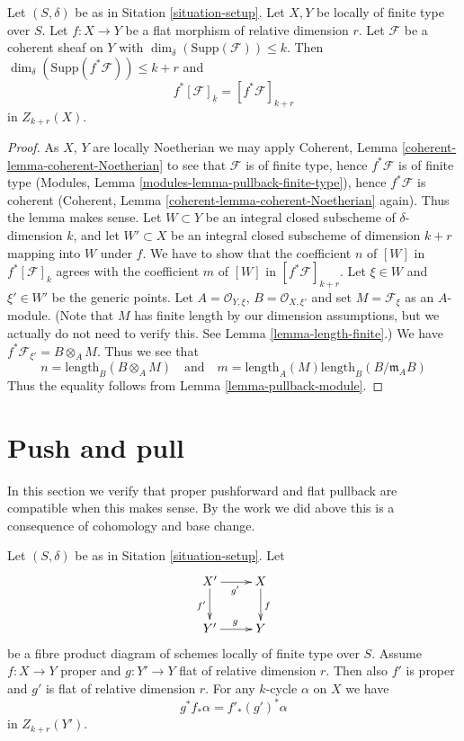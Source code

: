 \begin{lemma}
\label{lemma-pullback-coherent}
Let $(S, \delta)$ be as in Sitation \ref{situation-setup}.
Let $X, Y$ be locally of finite type over $S$.
Let $f : X \to Y$ be a flat morphism of relative dimension $r$.
Let $\mathcal{F}$ be a coherent sheaf on $Y$ with
$\dim_\delta(\text{Supp}(\mathcal{F})) \leq k$.
Then $\dim_\delta(\text{Supp}(f^*\mathcal{F})) \leq k + r$
and
$$
f^*[{\mathcal F}]_k = [f^*{\mathcal F}]_{k+r}
$$
in $Z_{k + r}(X)$.
\end{lemma}

\begin{proof}
As $X$, $Y$ are locally Noetherian we may apply
Coherent, Lemma \ref{coherent-lemma-coherent-Noetherian} to see
that $\mathcal{F}$ is of finite type, hence $f^*\mathcal{F}$ is
of finite type (Modules, Lemma \ref{modules-lemma-pullback-finite-type}),
hence $f^*\mathcal{F}$ is coherent
(Coherent, Lemma \ref{coherent-lemma-coherent-Noetherian} again).
Thus the lemma makes sense. Let $W \subset Y$ be an integral closed
subscheme of $\delta$-dimension $k$, and let $W' \subset X$ be
an integral closed subscheme of dimension $k + r$ mapping into $W$
under $f$. We have to show that the coefficient $n$ of
$[W]$ in $f^*[{\mathcal F}]_k$ agrees with the coefficient
$m$ of $[W]$ in $[f^*{\mathcal F}]_{k+r}$. Let $\xi \in W$ and
$\xi' \in W'$ be the generic points. Let
$A = \mathcal{O}_{Y, \xi}$, $B = \mathcal{O}_{X, \xi'}$
and set $M = \mathcal{F}_\xi$ as an $A$-module. (Note that
$M$ has finite length by our dimension assumptions, but we
actually do not need to verify this. See
Lemma \ref{lemma-length-finite}.)
We have $f^*\mathcal{F}_{\xi'} = B \otimes_A M$.
Thus we see that
$$
n = \text{length}_B(B \otimes_A M)
\quad
\text{and}
\quad
m = \text{length}_A(M) \text{length}_B(B/\mathfrak m_AB)
$$
Thus the equality follows from Lemma \ref{lemma-pullback-module}.
\end{proof}



\section{Push and pull}
\label{section-push-pull}

\noindent
In this section we verify that proper pushforward and flat pullback
are compatible when this makes sense. By the work we did above this
is a consequence of cohomology and base change.

\begin{lemma}
\label{lemma-flat-pullback-proper-pushforward}
Let $(S, \delta)$ be as in Sitation \ref{situation-setup}.
Let
$$
\xymatrix{
X' \ar[r]_{g'} \ar[d]_{f'} & X \ar[d]^f \\
Y' \ar[r]^g & Y
}
$$
be a fibre product diagram of schemes locally of finite type over $S$.
Assume $f : X \to Y$ proper and $g : Y' \to Y$ flat of relative dimension $r$.
Then also $f'$ is proper and $g'$ is flat of relative dimension $r$.
For any $k$-cycle $\alpha$ on $X$ we have
$$
g^*f_*\alpha = f'_*(g')^*\alpha
$$
in $Z_{k + r}(Y')$.
\end{lemma}

